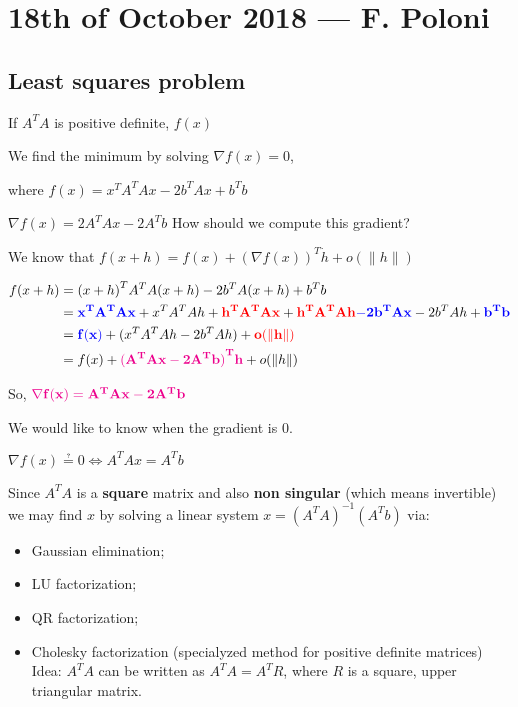 \documentclass[computationalMathematics.tex]{subfiles}
\begin{document}
\section{18th of October 2018 --- F. Poloni}


\subsection{Least squares problem}

If ${A}^{T}A$ is positive definite, $f(x)$ 

We find the minimum by solving $\nabla f(x) = 0$, 

where $f(x) = {x}^{T}{A}^{T}Ax - 2{b}^{T}Ax + {b}^{T}b$

$\nabla  f(x) = 2 {A}^{T}Ax - 2{A}^{T}b$
How should we compute this gradient? 

We know that $f(x+h) = f(x) + {(\nabla f(x))}^{T} \dot h  + o(\|h\|)$

\begin{equation}
  \begin{split}
    f(x+h) & = {(x+h)}^{T} {A}^{T}A(x+h) - 2{b}^{T}A(x+h) +{b}^{T}b\\
    & = {\bf \color{blue} {x}^{T}{A}^{T}Ax} + {x}^{T}{A}^{T}Ah + {\bf \color{red} {h}^{T}{A}^{T}Ax} + {\bf \color{red} {h}^{T}{A}^{T}Ah} {\bf \color{blue}- 2{b}^{T}Ax} - 2{b}^{T}Ah + {\bf \color{blue} {b}^{T}b}\\
    & = {\bf \color{blue}f(x)} +({x}^{T}{A}^{T}Ah-2{b}^{T}Ah) + {\bf \color{red} o(\|h\|)}\\
    & = f(x) + {\bf \color{magenta} {({A}^{T}Ax-2{A}^{T}b)}^{T}h} + o(\|h\|) 
  \end{split}
\end{equation}

So, ${\bf \color{magenta} \nabla  f(x) = {A}^{T}Ax - 2{A}^{T}b}$

We would like to know when the gradient is $0$.

$\nabla  f(x) \questeq 0 \Leftrightarrow {A}^{T}Ax = {A}^{T}b$

Since ${A}^{T}A$ is a {\bf square} matrix and also {\bf non singular} (which means invertible) we may find $x$ by solving a linear system $x={({A}^{T}A)}^{-1}({A}^{T}b)$ via:

\begin{itemize}
  \item Gaussian elimination;
  \item LU factorization;
  \item QR factorization;
  \item Cholesky factorization (specialyzed method for positive definite matrices)
    Idea: ${A}^{T}A$ can be written as ${A}^{T}A={A}^{T}R$, where $R$ is a square, upper triangular matrix.
\end{itemize}
\end{document}
